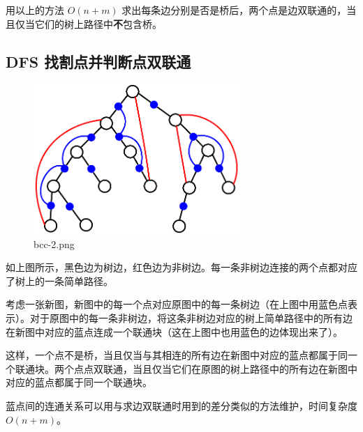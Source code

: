 用以上的方法 $O(n+m)$ 求出每条边分别是否是桥后，两个点是边双联通的，当且仅当它们的树上路径中\textbf{不}包含桥。

\subsection{DFS 找割点并判断点双联通}

\begin{figure}[htbp]
\centering
\includegraphics[width=0.7\textwidth]{docs/graph/images/bcc-2.png} 
\caption{bcc-2.png}
\end{figure}

如上图所示，黑色边为树边，红色边为非树边。每一条非树边连接的两个点都对应了树上的一条简单路径。

考虑一张新图，新图中的每一个点对应原图中的每一条树边（在上图中用蓝色点表示）。对于原图中的每一条非树边，将这条非树边对应的树上简单路径中的所有边在新图中对应的蓝点连成一个联通块（这在上图中也用蓝色的边体现出来了）。

这样，一个点不是桥，当且仅当与其相连的所有边在新图中对应的蓝点都属于同一个联通块。两个点点双联通，当且仅当它们在原图的树上路径中的所有边在新图中对应的蓝点都属于同一个联通块。

蓝点间的连通关系可以用与求边双联通时用到的差分类似的方法维护，时间复杂度 $O(n+m)$。
